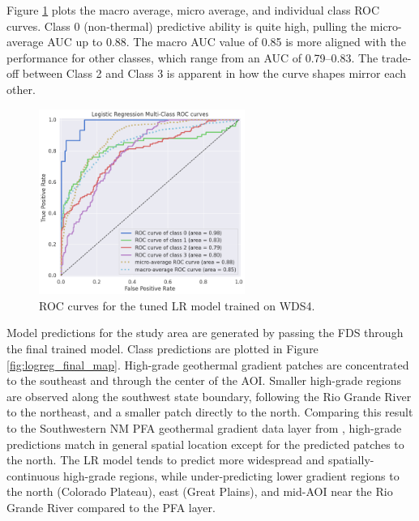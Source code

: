 Figure \ref{fig:logreg_auc} plots the macro average, micro average, and individual class ROC curves. Class 0 (non-thermal) predictive ability is quite high, pulling the micro-average AUC up to 0.88.  The macro AUC value of 0.85 is more aligned with the performance for other classes, which range from an AUC of 0.79--0.83. The trade-off between Class 2 and Class 3 is apparent in how the curve shapes mirror each other.

\begin{figure}[!htp]
\centering
\includegraphics[width=0.6\textwidth]{templates/images/Figure-LR-AUC.png}
\singlespacing
\caption[Logistic regression ROC curves]{ROC curves for the tuned LR model trained on WDS4.}
\label{fig:logreg_auc}
\end{figure}

Model predictions for the study area are generated by passing the FDS through the final trained model. Class predictions are plotted in Figure \ref{fig:logreg_final_map}. High-grade geothermal gradient patches are concentrated to the southeast and through the center of the AOI. Smaller high-grade regions are observed along the southwest state boundary, following the Rio Grande River to the northeast, and a smaller patch directly to the north.  Comparing this result to the Southwestern NM PFA geothermal gradient data layer from \citet{bielicki_hydrogeolgic_2015}, high-grade predictions match in general spatial location except for the predicted patches to the north. The LR model tends to predict more widespread and spatially-continuous high-grade regions, while under-predicting lower gradient regions to the north (Colorado Plateau), east (Great Plains), and mid-AOI near the Rio Grande River compared to the PFA layer.

